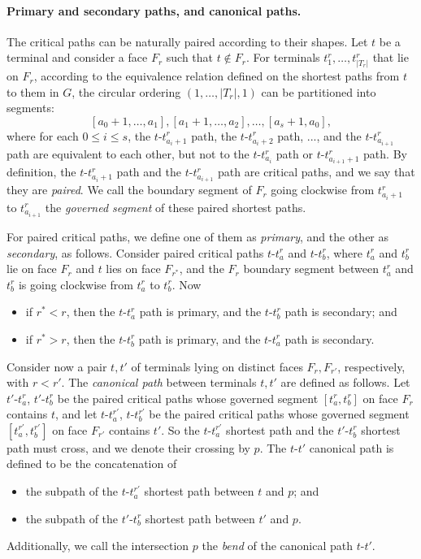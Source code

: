 \documentclass[11pt]{article}
\begin{document}
\paragraph{Primary and secondary paths, and canonical paths.}
The critical paths can be naturally paired according to their shapes.
Let $t$ be a terminal and consider a face $F_r$ such that $t\notin F_r$. For terminals $t^r_1,\ldots,t^r_{|T_r|}$ that lie on $F_r$, according to the equivalence relation defined on the shortest paths from $t$ to them in $G$, the circular ordering $(1,\ldots,|T_r|,1)$ can be partitioned into segments: 
\[[a_0+1,\ldots,a_1],[a_1+1,\ldots,a_2],\ldots,[a_{s}+1,a_0],\]
where for each $0\le i\le s$, the $t$-$t^r_{a_i+1}$ path, the $t$-$t^r_{a_i+2}$ path, ..., and the $t$-$t^r_{a_{i+1}}$ path are equivalent to each other, but not to the $t$-$t^r_{a_i}$ path or $t$-$t^r_{a_{i+1}+1}$ path.
By definition, the $t$-$t^r_{a_i+1}$ path and the $t$-$t^r_{a_{i+1}}$ path are critical paths, and we say that they are \emph{paired}. 
We call the boundary segment of $F_r$ going clockwise from $t^r_{a_i+1}$ to $t^r_{a_{i+1}}$ the \emph{governed segment} of these paired shortest paths.

For paired critical paths, we define one of them as \emph{primary}, and the other as \emph{secondary}, as follows. Consider paired critical paths $t$-$t^r_{a}$ and $t$-$t^r_{b}$, where $t^r_a$ and $t^r_b$ lie on face $F_r$ and $t$ lies on face $F_{r^*}$, and the $F_r$ boundary segment between $t^r_{a}$ and $t^r_{b}$ is going clockwise from $t^r_{a}$ to $t^r_{b}$. Now
\begin{itemize}
\item if $r^*<r$, then the $t$-$t^r_{a}$ path is primary, and the $t$-$t^r_{b}$ path is secondary; and
\item if $r^*>r$, then the $t$-$t^r_{b}$ path is primary, and the $t$-$t^r_{a}$ path is secondary.
\end{itemize}

Consider now a pair $t,t'$ of terminals lying on distinct faces $F_r,F_{r'}$, respectively, with $r<r'$. The \emph{canonical path} between terminals $t,t'$ are defined as follows.
Let $t'$-$t^r_{a}$, $t'$-$t^r_b$ be the paired critical paths whose governed segment $[t^r_{a},t^r_b]$ on face $F_r$ contains $t$, and let $t$-$t^{r'}_{a}$, $t$-$t^{r'}_b$ be the paired critical paths whose governed segment $[t^{r'}_{a},t^{r'}_b]$ on face $F_{r'}$ contains $t'$. So the $t$-$t^{r'}_{a}$ shortest path and the $t'$-$t^{r}_{b}$ shortest path must cross, and we denote their crossing by $p$.
The $t$-$t'$ canonical path is defined to be the concatenation of 
\begin{itemize}
\item the subpath of the $t$-$t^{r'}_{a}$ shortest path between $t$ and $p$; and 
\item the subpath of the $t'$-$t^{r}_{b}$ shortest path between $t'$ and $p$.
\end{itemize}
Additionally, we call the intersection $p$ the \emph{bend} of the canonical path $t$-$t'$. 
\end{document}
